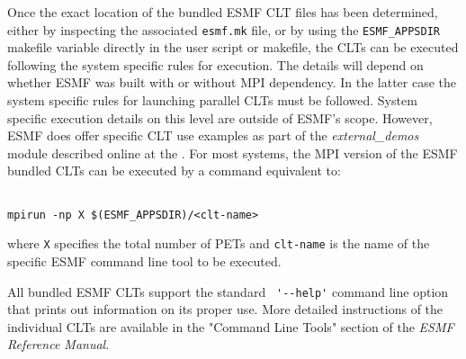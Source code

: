 Once the exact location of the bundled ESMF CLT files has been 
determined, either by inspecting the associated {\tt esmf.mk} file, or by using 
the {\tt ESMF\_APPSDIR} makefile variable directly in the user script or 
makefile, the CLTs can be executed following the system specific rules 
for execution. The details will depend on whether ESMF was built with or without 
MPI dependency. In the latter case the system specific rules for launching 
parallel CLTs must be followed. System specific execution details on 
this level are outside of ESMF's scope. However, ESMF does offer specific 
CLT use examples as part of the {\it external\_demos} module described 
online at the 
. 
For most systems, the MPI version of the ESMF bundled CLTs can be 
executed by a command equivalent to:

\begin{verbatim}

mpirun -np X $(ESMF_APPSDIR)/<clt-name>

\end{verbatim}
 
where {\tt X} specifies the total number of PETs and {\tt clt-name} is the 
name of the specific ESMF command line tool to be executed.
 
All bundled ESMF CLTs support the standard \verb+ '--help'+ command line 
option that prints out information on its proper use.  More detailed 
instructions of the individual CLTs are available in the "Command Line Tools" 
section of the {\it ESMF Reference Manual}.
